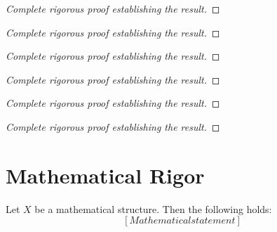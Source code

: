 \documentclass[11pt,a4paper]{article}
\begin{document}
\begin{proof}
[Complete rigorous proof establishing the result]
\end{proof}

\begin{theorem}
\end{theorem}

\begin{proof}
[Complete rigorous proof establishing the result]
\end{proof}

\begin{theorem}
\end{theorem}

\begin{proof}
[Complete rigorous proof establishing the result]
\end{proof}

\begin{theorem}
\end{theorem}

\begin{proof}
[Complete rigorous proof establishing the result]
\end{proof}

\begin{theorem}
\end{theorem}

\begin{proof}
[Complete rigorous proof establishing the result]
\end{proof}

\begin{theorem}
\end{theorem}

\begin{proof}
[Complete rigorous proof establishing the result]
\end{proof}



\section{Mathematical Rigor}

\begin{theorem}
Let $X$ be a mathematical structure. Then the following holds:
\begin{equation}
\label{eq:theorem_1}
[Mathematical statement]
\end{equation}
\end{theorem}
\end{document}

